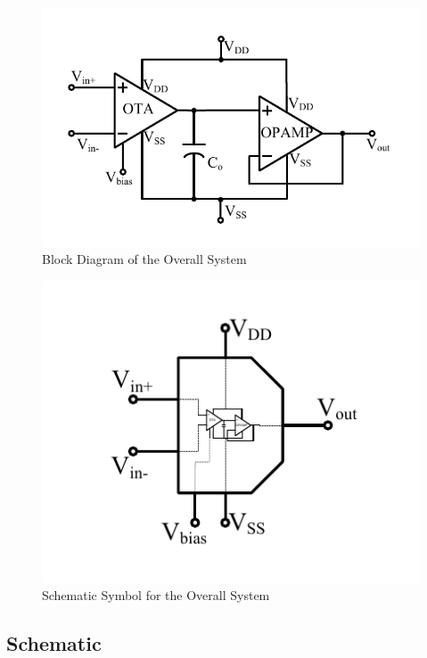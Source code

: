 \begin{figure} [H]
\centering
\includegraphics[scale=1]{Figures/System_Level/System_Overview.pdf}
\caption{Block Diagram of the Overall System}
\end{figure}

\begin{figure} [H]
\centering
\includegraphics[scale=1]{Figures/System_Level/System_Symbol.pdf}
\caption{Schematic Symbol for the Overall System}
\end{figure}

\subsection{Schematic}

